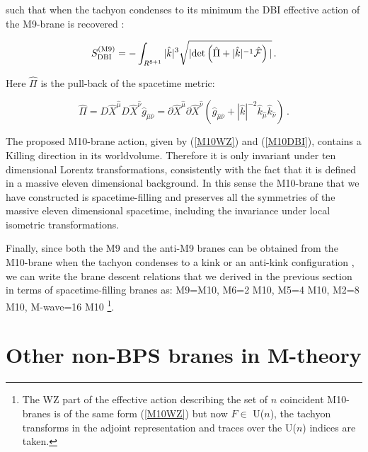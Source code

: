 \documentclass[12pt,a4paper]{article}
\begin{document}
\noindent such that when the tachyon condenses to its minimum
the DBI effective action
of the M9-brane is recovered \cite{BvdS, EL1}:

\begin{equation}
\label{M9DBI}
S^{({\rm M9})}_{{\rm DBI}}=-\int_{R^{8+1}}|{\hat k}|^3 
\sqrt{|{\rm det} \left( {\hat \Pi}+ |{\hat k}|^{-1}
{\hat {\cal F}} \right)|}\, .
\end{equation}

\noindent Here ${\hat \Pi}$ is the pull-back of the spacetime
metric:

\begin{equation}
{\hat \Pi} = D {\hat X}^{\hat \mu} D {\hat X}^{\hat \nu} 
{\hat g}_{{\hat \mu}{\hat \nu}} = 
\partial {\hat X}^{\hat \mu} \partial {\hat X}^{\hat \nu} 
\left( {\hat g}_{{\hat \mu}{\hat \nu}}
+ |{\hat k}|^{-2}{\hat k}_{\hat \mu}{\hat k}_{\hat \nu} \right) \, .
\end{equation}

The proposed M10-brane 
action, given by (\ref{M10WZ}) and (\ref{M10DBI}), contains a Killing direction
in its worldvolume. Therefore it is only invariant under ten dimensional
Lorentz transformations, consistently with the fact that it
is defined in a massive eleven dimensional background.
In this sense the M10-brane that we have constructed
is spacetime-filling and preserves all the symmetries of the massive
eleven dimensional spacetime, including the invariance under local
isometric transformations.

Finally, since both the M9 and the anti-M9 branes can be obtained
from the M10-brane when the tachyon condenses to a kink or an
anti-kink configuration \cite{Horava}, we
can write the brane descent relations that we derived in the previous
section in terms of spacetime-filling
branes as: M9=M10, M6=2 M10, M5=4 M10, M2=8 M10, 
M-wave=16 M10 \footnote{The WZ part
of the effective action describing the set of 
$n$ coincident M10-branes
is of the same form (\ref{M10WZ}) but now ${\hat F}\in$ U($n$), the
tachyon transforms in the adjoint representation \cite{Horava} 
and traces over the U($n$) indices are taken.}.


\section{Other non-BPS branes in M-theory}
\end{document}
